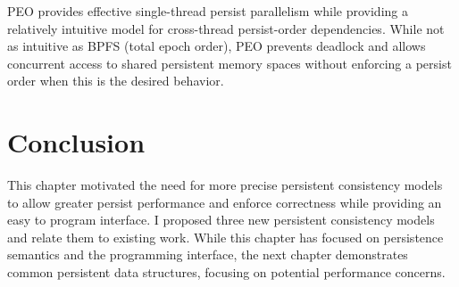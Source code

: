 PEO provides effective single-thread persist parallelism while providing a relatively intuitive model for cross-thread persist-order dependencies.
While not as intuitive as BPFS (total epoch order), PEO prevents deadlock and allows concurrent access to shared persistent memory spaces without enforcing a persist order when this is the desired behavior.

\section{Conclusion}
\label{sec:PMC:Conclusion}

This chapter motivated the need for more precise persistent consistency models to allow greater persist performance and enforce correctness while providing an easy to program interface.
I proposed three new persistent consistency models and relate them to existing work.
While this chapter has focused on persistence semantics and the programming interface, the next chapter demonstrates common persistent data structures, focusing on potential performance concerns.
